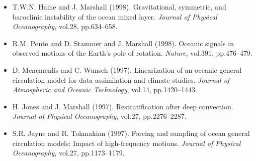 \begin{itemize}
\item T.W.N. Haine and J. Marshall (1998). Gravitational, symmetric, and
baroclinic instability of the ocean mixed layer. {\it Journal of Physical
Oceanography}, vol.28, pp.634--658. 

\item R.M. Ponte and D. Stammer and J. Marshall (1998). Oceanic signals in
observed motions of the Earth's pole of rotation. {\it Nature}, vol.391,
pp.476--479. 

\item D. Menemenlis and C. Wunsch (1997). Linearization of an oceanic
general circulation model for data assimilation and climate studies.
{\it Journal of Atmospheric and Oceanic Technology}, vol.14, pp.1420--1443. 

\item H. Jones and J. Marshall (1997). Restratification after deep
convection. {\it Journal of Physical Oceanography}, vol.27, pp.2276--2287. 

\item S.R. Jayne and R. Tokmakian (1997). Forcing and sampling of ocean
general circulation models: Impact of high-frequency motions. {\it Journal of
Physical Oceanography}, vol.27, pp.1173--1179. 

\end{itemize}
